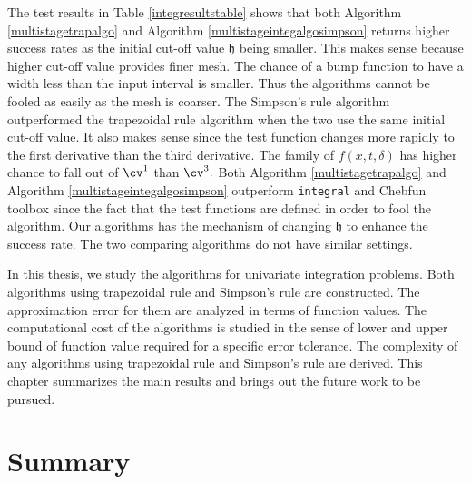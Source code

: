 \documentclass{iitthesis}
\theoremstyle{definition}
\theoremstyle{remark}
\begin{document}
The test results in Table \ref{integresultstable} shows that both Algorithm \ref{multistagetrapalgo} and Algorithm \ref{multistageintegalgosimpson} returns higher success rates as the initial cut-off value $\mathfrak{h}$ being smaller. This makes sense because higher cut-off value provides finer mesh. The chance of a bump function to have a width less than the input interval is smaller. Thus the algorithms cannot be fooled as easily as the mesh is coarser. The Simpson's rule algorithm outperformed the trapezoidal rule algorithm when the two use the same initial cut-off value. It also makes sense since the test function changes more rapidly to the first derivative than the third derivative. The family of $f(x,t,\delta)$ has higher chance to fall out of $\cv^1$ than $\cv^3.$ Both Algorithm \ref{multistagetrapalgo} and Algorithm \ref{multistageintegalgosimpson} outperform {\tt integral} and Chebfun toolbox since the fact that the test functions are defined in order to fool the algorithm. Our algorithms has the mechanism of changing $\mathfrak{h}$ to enhance the success rate. The two comparing algorithms do not have similar settings.




In this thesis, we study the algorithms for univariate integration problems. Both algorithms using trapezoidal rule and Simpson's rule are constructed. The approximation error for them are analyzed in terms of function values. The computational cost of the algorithms is studied in the sense of lower and upper bound of function value required for a specific error tolerance. The complexity of any algorithms using trapezoidal rule and Simpson's rule are derived. This chapter summarizes the main results and brings out the future work to be pursued.


\section{Summary}
\end{document}
